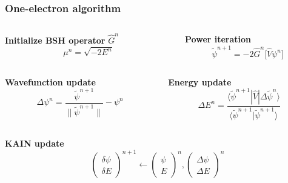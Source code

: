 \begin{frame}
    \frametitle{One-electron algorithm}

    \begin{columns}
    \begin{column}{.50\textwidth}
    \centering
    \textbf{Initialize BSH operator} $\hat{G}^n$
    \begin{equation}
        \nonumber
        \mu^n = \sqrt{-2E^n}
    \end{equation}
    \end{column}

    \begin{column}{.50\textwidth}
    \centering
    \textbf{Power iteration}
    \begin{equation}
	\nonumber
	\tilde{\psi}^{n+1} = -2\hat{G}^n \Big[ \hat{V} \psi^n \Big]
    \end{equation}
    \end{column}
    \end{columns}

    \vspace{5mm}

    \begin{columns}
    \begin{column}{.50\textwidth}
    \centering
    \textbf{Wavefunction update}
    \begin{equation}
	\nonumber
	\Delta\psi^n = \frac{\tilde{\psi}^{n+1}}{\|\tilde{\psi}^{n+1}\|} - \psi^n
    \end{equation}
    \end{column}

    \begin{column}{.50\textwidth}
    \centering
    \textbf{Energy update}
    \begin{equation}
	\nonumber
	\Delta E^n =
        \frac{\langle\tilde{\psi}^{n+1}|\hat{V}|\Delta\tilde{\psi}^n\rangle}
        {\langle\tilde{\psi}^{n+1}|\tilde{\psi}^{n+1}\rangle}
    \end{equation}
    \end{column}
    \end{columns}

    \vspace{5mm}

    \centering
    \textbf{KAIN update}
    \begin{equation}
	\nonumber
        \left(
        \begin{matrix}
        \delta \psi\\
        \delta E
        \end{matrix}
        \right)^{n+1}
        \longleftarrow
        \left(
        \begin{matrix}
        \psi\\
        E
        \end{matrix}
        \right)^n
        ,
        \left(
        \begin{matrix}
        \Delta \psi\\
        \Delta E
        \end{matrix}
        \right)^n
    \end{equation}


\end{frame}
